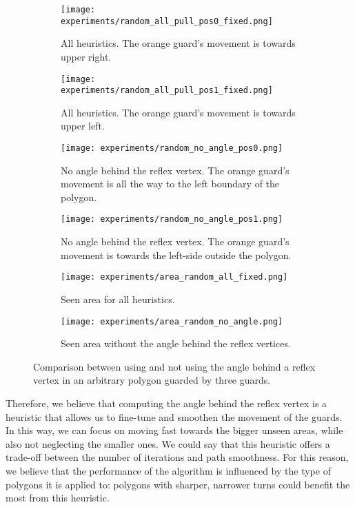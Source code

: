 \begin{figure}[h!]
    \centering
    \begin{subfigure}{0.45\textwidth}
        \texttt{[image: experiments/random\_all\_pull\_pos0\_fixed.png]}
        \caption{All heuristics. The orange guard's movement is towards upper right.}
        \label{fig:all_angle_pos0}
    \end{subfigure}
    \hfill
    \begin{subfigure}{0.45\textwidth}
        \texttt{[image: experiments/random\_all\_pull\_pos1\_fixed.png]}
        \caption{All heuristics. The orange guard's movement is towards upper left.}
        \label{fig:all_angle_pos1}
    \end{subfigure}
    \vfill
    \begin{subfigure}{0.45\textwidth}
        \texttt{[image: experiments/random\_no\_angle\_pos0.png]}
        \caption{No angle behind the reflex vertex. The orange guard's movement is all the way to the left boundary of the polygon.}
        \label{fig:no_angle_pos0}
    \end{subfigure}
    \hfill
    \begin{subfigure}{0.45\textwidth}
        \texttt{[image: experiments/random\_no\_angle\_pos1.png]}
        \caption{No angle behind the reflex vertex. The orange guard's movement is towards the left-side outside the polygon.}
        \label{fig:no_angle_pos1}
    \end{subfigure}
    \vfill
    \begin{subfigure}{0.45\textwidth}
        \texttt{[image: experiments/area\_random\_all\_fixed.png]}
        \caption{Seen area for all heuristics.}
        \label{fig:area_all_angle}
    \end{subfigure}
    \hfill
    \begin{subfigure}{0.45\textwidth}
        \texttt{[image: experiments/area\_random\_no\_angle.png]}
        \caption{Seen area without the angle behind the reflex vertices.}
        \label{fig:area_no_angle}
    \end{subfigure}
    \caption{Comparison between using and not using the angle behind a reflex vertex in an arbitrary polygon guarded by three guards.}
    \label{fig:no_angle}
\end{figure}

Therefore, we believe that computing the angle behind the reflex vertex is a heuristic that allows us to fine-tune and smoothen the movement of the guards. In this way, we can focus on moving fast towards the bigger unseen areas, while also not neglecting the smaller ones. We could say that this heuristic offers a trade-off between the number of iterations and path smoothness. For this reason, we believe that the performance of the algorithm is influenced by the type of polygons it is applied to: polygons with sharper, narrower turns could benefit the most from this heuristic.

